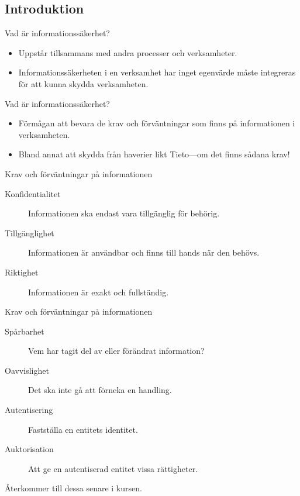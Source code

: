 \documentclass{beamer}
\begin{document}
\subsection{Introduktion}

\begin{frame}{Vad är informationssäkerhet?}
  \begin{itemize}
    \item Uppstår tillsammans med andra processer och verksamheter.

    \item Informationssäkerheten i en verksamhet har inget egenvärde måste 
      integreras för att kunna skydda verksamheten.

  \end{itemize}
\end{frame}

\begin{frame}{Vad är informationssäkerhet?}
  \begin{itemize}
    \item Förmågan att bevara de krav och förväntningar som finns på 
      informationen i verksamheten.

    \item Bland annat att skydda från haverier likt Tieto---om det finns sådana 
      krav!

  \end{itemize}
\end{frame}

\begin{frame}{Krav och förväntningar på informationen}
  \begin{description}
    \item[Konfidentialitet] Informationen ska endast vara tillgänglig för 
      behörig.

    \item[Tillgänglighet] Informationen är användbar och finns till hands när 
      den behövs.

    \item[Riktighet] Informationen är exakt och fullständig.

  \end{description}
\end{frame}

\begin{frame}{Krav och förväntningar på informationen}
  \begin{description}
    \item[Spårbarhet] Vem har tagit del av eller förändrat information?
    \item[Oavvislighet] Det ska inte gå att förneka en handling.
    \item[Autentisering] Fastställa en entitets identitet.
    \item[Auktorisation] Att ge en autentiserad entitet vissa rättigheter.
  \end{description}
  Återkommer till dessa senare i kursen.
\end{frame}
\end{document}
